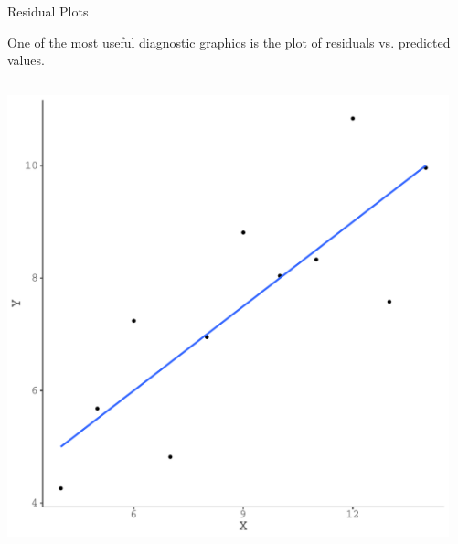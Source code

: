\documentclass{beamer}\usepackage[]{graphicx}\usepackage[]{color}
\makeatletter
\def\maxwidth{ %
  \ifdim\Gin@nat@width>\linewidth
    \linewidth
  \else
    \Gin@nat@width
  \fi
}
\newenvironment{knitrout}{}{} %
\makeatother
\begin{document}
\watermarkoff %

\begin{frame}{Residual Plots}

  One of the most useful diagnostic graphics is the plot of residuals vs. 
  predicted values.

\vb

\begin{columns}
\begin{column}{0.5\textwidth}
      
\begin{knitrout}\footnotesize
{}\color{fgcolor}

{\centering \includegraphics[width=\maxwidth]{figure/unnamed-chunk-1-1} 

}



\end{knitrout}
\end{column}
    
\begin{column}{0.5\textwidth}
      
\begin{knitrout}\footnotesize
{}\color{fgcolor}


\end{knitrout}
\end{column}
\end{columns}
\end{frame}
\end{document}
